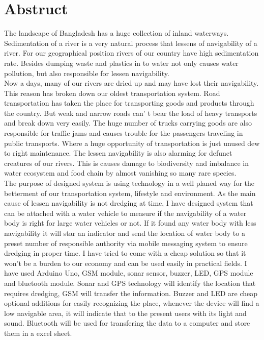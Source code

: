\documentclass[12pt, top = 1 inch, bottom = 1 inch, left = 1.2 inch, top = .8 inch]{book}
\begin{document}
	\section*{Abstruct}
	The landscape of Bangladesh has a huge collection of inland waterways. Sedimentation of a river is a very natural process that lessens of navigability of a river. For our geographical position rivers of our country have high sedimentation rate. Besides dumping waste and plastics in to water not only causes water pollution, but also responsible for lessen navigability.\\ 
	Now a days, many of our rivers are dried up and may have lost their navigability. This reason has broken down our oldest 				transportation system.  Road transportation has taken the place for transporting goods and products through the country. But weak and narrow roads can’ t bear the load of heavy transports and break down very easily. The huge number of trucks carrying goods are also responsible for traffic jams and causes trouble for the passengers traveling in public transports. Where a huge opportunity of transportation is just unused dew to right maintenance. The lessen navigability is also alarming for defunct creatures of our rivers. This is causes damage to biodiversity 	and imbalance in water ecosystem and food chain by almost vanishing so many rare species.\\
	The purpose of designed system is using technology in a well planed way for the betterment of our transportation system, lifestyle and environment. As the main cause of lessen navigability is not dredging at time, I have designed system that can be attached with a water vehicle to measure if the navigability of a water body is right for large water vehicles or not. If it found any water body with less navigability it will star an indicator and send the location of water body to a preset number of responsible authority via mobile messaging system to ensure dredging in proper time. I have tried to come with a cheap solution so that it won’t be a burden to our economy and can be used easily in practical fields. I have used Arduino Uno, GSM module, sonar sensor, buzzer, LED, GPS module and bluetooth module. Sonar and GPS technology will identify the location that requires dredging, GSM will transfer the information. Buzzer and LED are cheap optional additions for easily recognizing the place, whenever the device will find a low navigable area, it will indicate that to the present users with its light and sound. Bluetooth will be used for transfering the data to a computer and store them in a excel sheet.
\end{document}
